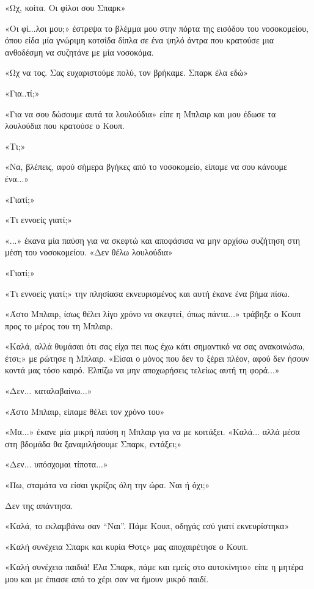 \documentclass[12pt,twoside, openany]{book}
\begin{document}
«Ωχ, κοίτα. Οι φίλοι σου Σπαρκ»

«Οι φί...λοι μου;» έστρεψα το βλέμμα μου στην πόρτα της εισόδου του νοσοκομείου, όπου είδα μία γνώριμη κοτσίδα δίπλα σε ένα ψηλό άντρα που κρατούσε μια ανθοδέσμη να συζητάνε με μία νοσοκόμα.

«Ωχ να τος. Σας ευχαριστούμε πολύ, τον βρήκαμε. Σπαρκ έλα εδώ»

«Για..τί;»

«Για να σου δώσουμε αυτά τα λουλούδια» είπε η Μπλαιρ και μου έδωσε τα λουλούδια που κρατούσε ο Κουπ.

«Τι;»

«Να, βλέπεις, αφού σήμερα βγήκες από το νοσοκομείο, είπαμε να σου κάνουμε ένα...»

«Γιατί;»

«Τι εννοείς γιατί;»

«...» έκανα μία παύση για να σκεφτώ και αποφάσισα να μην αρχίσω συζήτηση στη μέση του νοσοκομείου. «Δεν θέλω λουλούδια»

«Γιατί;»

«Τι εννοείς γιατί;» την πλησίασα εκνευρισμένος και αυτή έκανε ένα βήμα πίσω.

«Άστο Μπλαιρ, ίσως θέλει λίγο χρόνο να σκεφτεί, όπως πάντα...» τράβηξε ο Κουπ προς το μέρος του τη Μπλαιρ.

«Καλά, αλλά θυμάσαι ότι σας είχα πει πως έχω κάτι σημαντικό να σας ανακοινώσω, έτσι;» με ρώτησε η Μπλαιρ. «Είσαι ο μόνος που δεν το ξέρει πλέον, αφού δεν ήσουν κοντά μας τόσο καιρό. Ελπίζω να μην αποχωρήσεις τελείως αυτή τη φορά...»

«Δεν... καταλαβαίνω...»

«Άστο Μπλαιρ, είπαμε θέλει τον χρόνο του»

«Μα...» έκανε μία μικρή παύση η Μπλαιρ για να με κοιτάξει. «Καλά... αλλά μέσα στη βδομάδα θα ξαναμιλήσουμε Σπαρκ, εντάξει;»

«Δεν... υπόσχομαι τίποτα...»

«Πω, σταμάτα να είσαι γκρίζος όλη την ώρα. Ναι ή όχι;»

Δεν της απάντησα.

«Καλά, το εκλαμβάνω σαν “Ναι”. Πάμε Κουπ, οδηγάς εσύ γιατί εκνευρίστηκα»

«Καλή συνέχεια Σπαρκ και κυρία Θοτς» μας αποχαιρέτησε ο Κουπ.

«Καλή συνέχεια παιδιά! Έλα Σπαρκ, πάμε και εμείς στο αυτοκίνητο» είπε η μητέρα μου και με έπιασε από το χέρι σαν να ήμουν μικρό παιδί.\\\\
\end{document}
